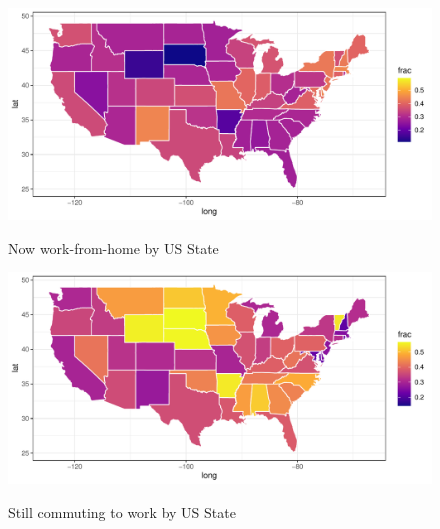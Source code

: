 \documentclass[12pt]{article}
\begin{document}
\begin{figure}
  \caption{Now work-from-home by US State} \label{fig:wfh}
\centering
\begin{minipage}{1.0 \linewidth}
  \includegraphics[width = \linewidth]{plots/geo_wfh.pdf} \\
  \begin{footnotesize}
    \end{footnotesize}
\end{minipage}
\end{figure} 

\begin{figure}
  \caption{Still commuting to work by US State} \label{fig:geo_still_commuting}
\centering
\begin{minipage}{1.0 \linewidth}
  \includegraphics[width = \linewidth]{plots/geo_still_commuting.pdf} \\
  \begin{footnotesize}
    \end{footnotesize}
\end{minipage}
\end{figure} 
\end{document}
